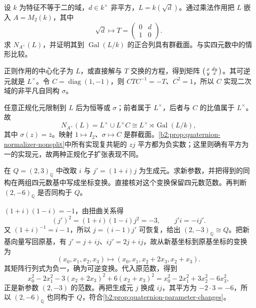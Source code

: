 \begin{exercise}\label{b2:ex:17-normalizer-nonsplit}
	设 \(k\) 为特征不等于二的域，\(d\in k^\times\) 非平方，\(L=k(\sqrt d)\)。通过乘法作用把 \(L\) 嵌入 \(A=M_2(k)\)，其中
	\[
		\sqrt d\longmapsto T=\begin{pmatrix}0&d\\1&0\end{pmatrix}.
	\]
	求 \(N_{A^\times}(L)\)，并证明其到 \(\operatorname{Gal}(L/k)\) 的正合列具有群截面。与实四元数中的情形比较。
\end{exercise}
\begin{solution}
	正则作用的中心化子为 \(L\)，或直接解与 \(T\) 交换的方程，得到矩阵 \(\begin{psmallmatrix}x&dy\\y&x\end{psmallmatrix}\)。其可逆元就是 \(L^\times\)。令 \(C=\operatorname{diag}(1,-1)\)，则 \(CTC^{-1}=-T\)、\(C^2=1\)，所以 \(C\) 实现二次域的非平凡自同构 \(\sigma\)。

	任意正规化元限制到 \(L\) 后为恒等或 \(\sigma\)；前者属于 \(L^\times\)，后者与 \(C\) 的比值属于 \(L^\times\)。故
	\[
		N_{A^\times}(L)=L^\times\cup L^\times C \cong L^\times\rtimes\operatorname{Gal}(L/k),
	\]
	其中 \(\sigma(z)=\bar z\)。映射 \(1\mapsto I_2\)、\(\sigma\mapsto C\) 是群截面。\cref{b2:prop:quaternion-normalizer-nonsplit}中所有实现复共轭的 \(zj\) 平方都为负实数；这里则确有平方为一的实现元，故两种正规化子扩张表现不同。
\end{solution}

\begin{exercise}\label{b2:ex:17-quaternion-parameter-change}
	在 \(Q=(2,3)_{\mathbb Q}\) 中改取 \(i\) 与 \(j'=(1+i)j\) 为生成元。求新参数，并把得到的同构在两组四元数基中写成坐标变换。直接核对这个变换保留四元数范数。再判断 \((2,-6)_{\mathbb Q}\) 是否同构于 \(Q\)。
\end{exercise}
\begin{solution}
	\((1+i)(1-i)=-1\)，由扭曲关系得
	\[
		(j')^2=(1+i)(1-i)j^2=-3,\qquad j'i=-ij'.
	\]
	又 \((1+i)^{-1}=i-1\)，所以 \(j=(i-1)j'\) 可恢复，给出 \((2,-3)_{\mathbb Q}\cong Q\)。把新基向量写回原基，有 \(j'=j+ij\)、\(ij'=2j+ij\)，故从新基坐标到原基坐标的变换为
	\[
		(x_0,x_1,x_2,x_3)\longmapsto (x_0,x_1,x_2+2x_3,x_2+x_3).
	\]
	其矩阵行列式为负一，确为可逆变换。代入原范数，得到
	\[
		x_0^2-2x_1^2-3(x_2+2x_3)^2+6(x_2+x_3)^2 =x_0^2-2x_1^2+3x_2^2-6x_3^2,
	\]
	正是新参数 \((2,-3)\) 的范数。再把生成元 \(j\) 换成 \(ij\)，其平方为 \(-2\cdot3=-6\)，所以 \((2,-6)_{\mathbb Q}\) 也同构于 \(Q\)，符合\cref{b2:prop:quaternion-parameter-changes}。
\end{solution}

